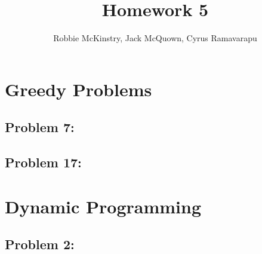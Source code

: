 \documentclass[12pt]{article}
\begin{document}
\title{Homework 5}
\author{Robbie McKinstry, Jack McQuown, Cyrus Ramavarapu}
\renewcommand{\today}{12 September 2016}
\renewcommand{\baselinestretch}{1.5}

\maketitle

\section*{Greedy Problems}
\subsection*{Problem 7:}

\subsection*{Problem 17:}

\section*{Dynamic Programming}
\subsection*{Problem 2:}
\end{document}
